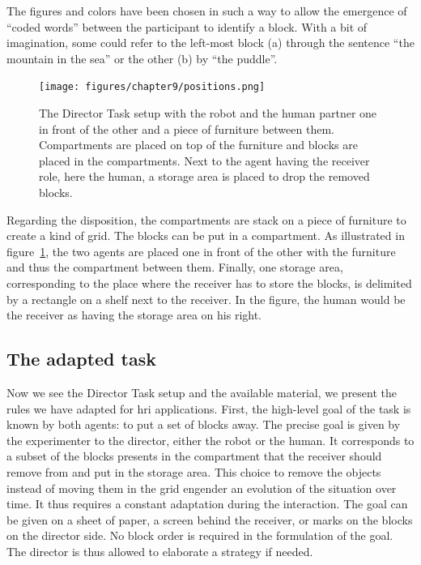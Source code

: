 The figures and colors have been chosen in such a way to allow the emergence of ``coded words'' between the participant to identify a block. With a bit of imagination, some could refer to the left-most block (a) through the sentence ``the mountain in the sea'' or the other (b) by ``the puddle''.

\begin{figure}[ht!]
\centering
\texttt{[image: figures/chapter9/positions.png]}
\caption{\label{fig:chap9_positions} The Director Task setup with the robot and the human partner one in front of the other and a piece of furniture between them. Compartments are placed on top of the furniture and blocks are placed in the compartments. Next to the agent having the receiver role, here the human, a storage area is placed to drop the removed blocks. }
\end{figure}

Regarding the disposition, the compartments are stack on a piece of furniture to create a kind of grid. The blocks can be put in a compartment. As illustrated in figure~\ref{fig:chap9_positions}, the two agents are placed one in front of the other with the furniture and thus the compartment between them. Finally, one storage area, corresponding to the place where the receiver has to store the blocks, is delimited by a rectangle on a shelf next to the receiver. In the figure, the human would be the receiver as having the storage area on his right.

\subsection{The adapted task}

Now we see the Director Task setup and the available material, we present the rules we have adapted for \acrshort{hri} applications. First, the high-level goal of the task is known by both agents: to put a set of blocks away. The precise goal is given by the experimenter to the director, either the robot or the human. It corresponds to a subset of the blocks presents in the compartment that the receiver should remove from and put in the storage area. This choice to remove the objects instead of moving them in the grid engender an evolution of the situation over time. It thus requires a constant adaptation during the interaction. The goal can be given on a sheet of paper, a screen behind the receiver, or marks on the blocks on the director side. No block order is required in the formulation of the goal. The director is thus allowed to elaborate a strategy if needed.

